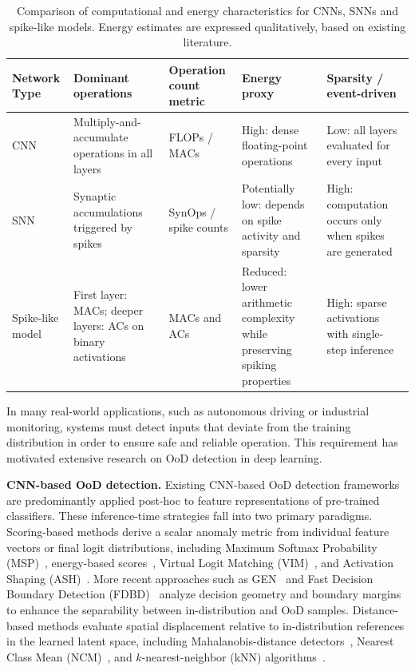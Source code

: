 \documentclass{ieeeaccess}
\begin{document}
\begin{table}[tbp]
\caption{Comparison of computational and energy characteristics for CNNs, SNNs and spike-like models. Energy estimates are expressed qualitatively, based on existing literature.}
\begin{center}
{\renewcommand{\arraystretch}{0.95}\small
{\small
\begin{tabular}{l >{\raggedright\arraybackslash}m{3.1cm} >{\raggedright\arraybackslash}m{3.1cm} >{\raggedright\arraybackslash}m{3.1cm} >{\raggedright\arraybackslash}m{3.1cm}}
\toprule
\textbf{Network Type} & \textbf{Dominant operations} & \textbf{Operation count metric} & \textbf{Energy proxy} & \textbf{Sparsity / event-driven} \\
\midrule
CNN & Multiply-and-accumulate operations in all layers & FLOPs / MACs & High: dense floating-point operations & Low: all layers evaluated for every input \\
\midrule
SNN & Synaptic accumulations triggered by spikes & SynOps / spike counts & Potentially low: depends on spike activity and sparsity & High: computation occurs only when spikes are generated \\
\midrule
Spike-like model & First layer: MACs; deeper layers: ACs on binary activations & MACs and ACs & Reduced: lower arithmetic complexity while preserving spiking properties & High: sparse activations with single-step inference \\
\bottomrule
\end{tabular}
}
}
\label{tab:energy-comparison-summary}
\end{center}
\end{table}

In many real-world applications, such as autonomous driving or industrial monitoring, systems must detect inputs that deviate from the training distribution in order to ensure safe and reliable operation. This requirement has motivated extensive research on OoD detection in deep learning.

\vspace{0.3em}
\noindent\textbf{CNN-based OoD detection.}
Existing CNN-based OoD detection frameworks are predominantly applied post-hoc to feature representations of pre-trained classifiers. These inference-time strategies fall into two primary paradigms. Scoring-based methods derive a scalar anomaly metric from individual feature vectors or final logit distributions, including Maximum Softmax Probability (MSP)~\cite{hendrycks2017baseline}, energy-based scores~\cite{liu2020energy}, Virtual Logit Matching (VIM)~\cite{wang2022vim}, and Activation Shaping (ASH)~\cite{djurisic2022ash}. More recent approaches such as GEN~\cite{10203747} and Fast Decision Boundary Detection (FDBD)~\cite{liu2024fast} analyze decision geometry and boundary margins to enhance the separability between in-distribution and OoD samples. Distance-based methods evaluate spatial displacement relative to in-distribution references in the learned latent space, including Mahalanobis-distance detectors~\cite{lee2018simple}, Nearest Class Mean (NCM)~\cite{huo2025ncm}, and $k$-nearest-neighbor (kNN) algorithms~\cite{sun2022knn}.
\end{document}
